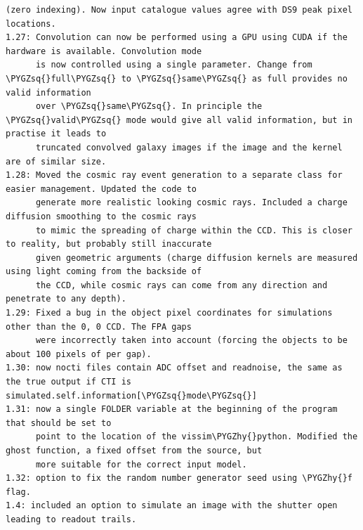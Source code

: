 \documentclass[a4paper,11pt,english]{sphinxmanual}
\def\PYGZhy{\char`\-}
\def\PYGZsq{\char`\'}
\renewcommand\PYGZsq{\textquotesingle}
\begin{document}
\begin{Verbatim}[commandchars=\\\{\}]
      (zero indexing). Now input catalogue values agree with DS9 peak pixel locations.
1.27: Convolution can now be performed using a GPU using CUDA if the hardware is available. Convolution mode
      is now controlled using a single parameter. Change from \PYGZsq{}full\PYGZsq{} to \PYGZsq{}same\PYGZsq{} as full provides no valid information
      over \PYGZsq{}same\PYGZsq{}. In principle the \PYGZsq{}valid\PYGZsq{} mode would give all valid information, but in practise it leads to
      truncated convolved galaxy images if the image and the kernel are of similar size.
1.28: Moved the cosmic ray event generation to a separate class for easier management. Updated the code to
      generate more realistic looking cosmic rays. Included a charge diffusion smoothing to the cosmic rays
      to mimic the spreading of charge within the CCD. This is closer to reality, but probably still inaccurate
      given geometric arguments (charge diffusion kernels are measured using light coming from the backside of
      the CCD, while cosmic rays can come from any direction and penetrate to any depth).
1.29: Fixed a bug in the object pixel coordinates for simulations other than the 0, 0 CCD. The FPA gaps
      were incorrectly taken into account (forcing the objects to be about 100 pixels of per gap).
1.30: now nocti files contain ADC offset and readnoise, the same as the true output if CTI is simulated.self.information[\PYGZsq{}mode\PYGZsq{}]
1.31: now a single FOLDER variable at the beginning of the program that should be set to
      point to the location of the vissim\PYGZhy{}python. Modified the ghost function, a fixed offset from the source, but
      more suitable for the correct input model.
1.32: option to fix the random number generator seed using \PYGZhy{}f flag.
1.4: included an option to simulate an image with the shutter open leading to readout trails.
\end{Verbatim}
\end{document}
